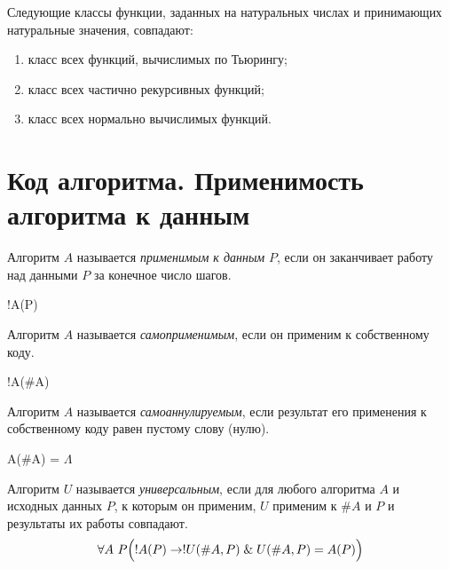 \begin{theorem}
	Следующие классы функции, заданных на натуральных числах и принимающих натуральные значения, совпадают:
	\begin{enumerate}
		\item класс всех функций, вычислимых по Тьюрингу;
		\item класс всех частично рекурсивных функций;
		\item класс всех нормально вычислимых функций.
	\end{enumerate}
\end{theorem}

\section{Код алгоритма. Применимость алгоритма к данным}

\begin{definition}
	Алгоритм $ A $ называется \emph{применимым к данным} $ P $, если он заканчивает работу над данными $ P $ за конечное число шагов.
\end{definition}

\begin{notation}
	!A(P)
\end{notation}

\begin{definition}
	Алгоритм $ A $ называется \emph{самоприменимым}, если он применим к собственному коду.
\end{definition}

\begin{notation}
	!A(\#A)
\end{notation}

\begin{definition}
	Алгоритм $ A $ называется \emph{самоаннулируемым}, если результат его применения к собственному коду равен пустому слову (нулю).
\end{definition}

\begin{notation}
	A(\#A) = $ \Lambda $
\end{notation}

\begin{definition}
	Алгоритм $ U $ называется \emph{универсальным}, если для любого алгоритма $ A $ и исходных данных $ P $, к которым он применим, $ U $ применим к $ \#A $ и $ P $ и результаты их работы совпадают.
	$$ \forall A~P \Bigl( !A(P) \to !U(\#A, P) \mathrel\& U(\#A, P) = A(P) \Bigr) $$
\end{definition}


